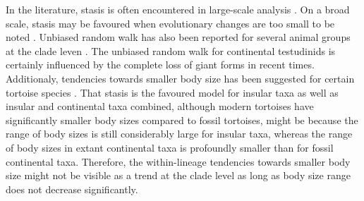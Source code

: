 In the literature, stasis is often encountered in large-scale analysis \citep{Smith2016, Hunt2006,Hunt2007,Hunt2015}. On a broad scale, stasis may be favoured when evolutionary changes are too small to be noted \citep{Hunt2015}.
Unbiased random walk has also been reported for several animal groups at the clade leven \citep{Smith2016}.
The unbiased random walk for continental testudinids is certainly influenced by the complete loss of giant forms in recent times. Additionaly, tendencies towards smaller body size has been suggested for certain tortoise species \citep{Klein2000,Steele2005,Franz2005,Speth2002}.
That stasis is the favoured model for insular taxa as well as insular and continental taxa combined, although modern tortoises have significantly smaller body sizes compared to fossil tortoises, might be because the range of body sizes is still considerably large for insular taxa, whereas the range of body sizes in extant continental taxa is profoundly smaller than for fossil continental taxa.
Therefore, the within-lineage tendencies towards smaller body size might not be visible as a trend at the clade level as long as body size range does not decrease significantly.

